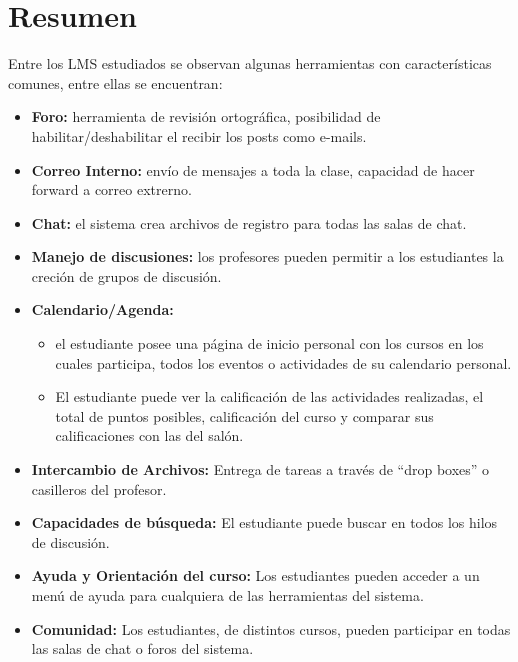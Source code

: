 \section{Resumen}
Entre los LMS estudiados se observan algunas herramientas con características comunes, entre ellas se encuentran:
\begin{itemize}
			\item \textbf{Foro:} herramienta de revisión ortográfica, posibilidad de habilitar/deshabilitar el recibir los posts como e-mails.
			\item \textbf{Correo Interno:} envío de mensajes a toda la clase, capacidad de hacer forward a correo extrerno.
			\item \textbf{Chat:} el sistema crea archivos de registro para todas las salas de chat.
			\item \textbf{Manejo de discusiones:} los profesores pueden permitir a los estudiantes la creción de grupos de discusión.
			\item \textbf{Calendario/Agenda:} 
				\begin{itemize}
					\item el estudiante posee una página de inicio personal con los cursos en los cuales participa, todos los eventos o actividades de su calendario personal. 
					\item El estudiante puede ver la calificación de las actividades realizadas, el total de puntos posibles, calificación del curso y comparar sus calificaciones con las del salón.
				\end{itemize}
			\item \textbf{Intercambio de Archivos:} Entrega de tareas a través de ``drop boxes'' o casilleros del profesor.
			\item \textbf{Capacidades de búsqueda:} El estudiante puede buscar en todos los hilos de discusión.
			\item \textbf{Ayuda y Orientación del curso:} Los estudiantes pueden acceder a un menú de ayuda para cualquiera de las herramientas del sistema.
			\item \textbf{Comunidad:} Los estudiantes, de distintos cursos, pueden participar en todas las salas de chat o foros del sistema.
\end{itemize}